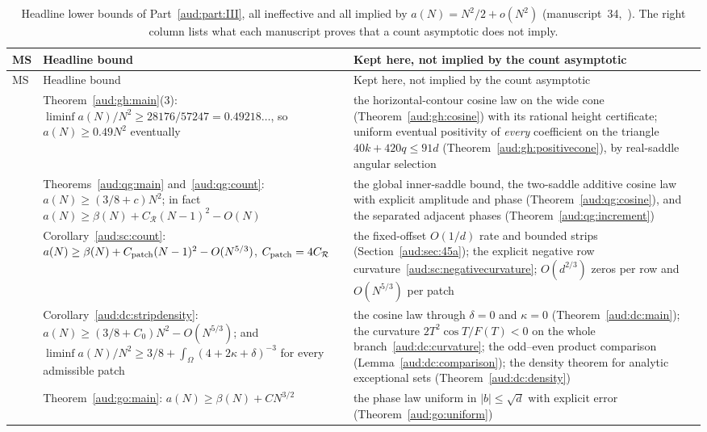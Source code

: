 \documentclass[11pt,a4paper]{article}
\numberwithin{equation}{section}
\begin{document}
{\small
\begin{longtable}{@{}>{\raggedright\arraybackslash}p{}
 >{\raggedright\arraybackslash}p{}
 >{\raggedright\arraybackslash}p{}@{}}
\caption{Headline lower bounds of Part~\ref{aud:part:III}, all ineffective and all implied by $a(N)=N^2/2+o(N^2)$ (manuscript~34,~\cite{pte}). The right column lists what each manuscript proves that a count asymptotic does not imply.}\label{aud:tab:headlines}\\
\toprule
MS & Headline bound & Kept here, not implied by the count asymptotic\\
\midrule\endfirsthead
\toprule
MS & Headline bound & Kept here, not implied by the count asymptotic\\
\midrule\endhead
37 & Theorem~\ref{aud:gh:main}(3): $\liminf a(N)/N^2\ge28176/57247=0.49218\ldots$, so $a(N)\ge0.49N^2$ eventually & the horizontal-contour cosine law on the wide cone (Theorem~\ref{aud:gh:cosine}) with its rational height certificate; uniform eventual positivity of \emph{every} coefficient on the triangle $40k+420q\le91d$ (Theorem~\ref{aud:gh:positivecone}), by real-saddle angular selection\\
49 & Theorems~\ref{aud:qg:main} and~\ref{aud:qg:count}: $a(N)\ge(3/8+c)N^2$; in fact $a(N)\ge\beta(N)+C_{\mathcal R}(N-1)^2-O(N)$ & the global inner-saddle bound, the two-saddle additive cosine law with explicit amplitude and phase (Theorem~\ref{aud:qg:cosine}), and the separated adjacent phases (Theorem~\ref{aud:qg:increment})\\
45 & Corollary~\ref{aud:sc:count}: $a(N)\ge\beta(N)+C_{\rm patch}(N-1)^2-O(N^{5/3})$, $C_{\rm patch}=4C_{\mathcal R}$ & the fixed-offset $O(1/d)$ rate and bounded strips (Section~\ref{aud:sec:45a}); the explicit negative row curvature~\eqref{aud:sc:negativecurvature}; $O(d^{2/3})$ zeros per row and $O(N^{5/3})$ per patch\\
40 & Corollary~\ref{aud:dc:stripdensity}: $a(N)\ge(3/8+C_0)N^2-O(N^{5/3})$; and $\liminf a(N)/N^2\ge3/8+\int_\Omega(4+2\kappa+\delta)^{-3}$ for every admissible patch & the cosine law through $\delta=0$ and $\kappa=0$ (Theorem~\ref{aud:dc:main}); the curvature $2T^2\cos T/F(T)<0$ on the whole branch~\eqref{aud:dc:curvature}; the odd--even product comparison (Lemma~\ref{aud:dc:comparison}); the density theorem for analytic exceptional sets (Theorem~\ref{aud:dc:density})\\
53 & Theorem~\ref{aud:go:main}: $a(N)\ge\beta(N)+CN^{3/2}$ & the phase law uniform in $|b|\le\sqrt d$ with explicit error (Theorem~\ref{aud:go:uniform})\\
\bottomrule
\end{longtable}}
\end{document}

